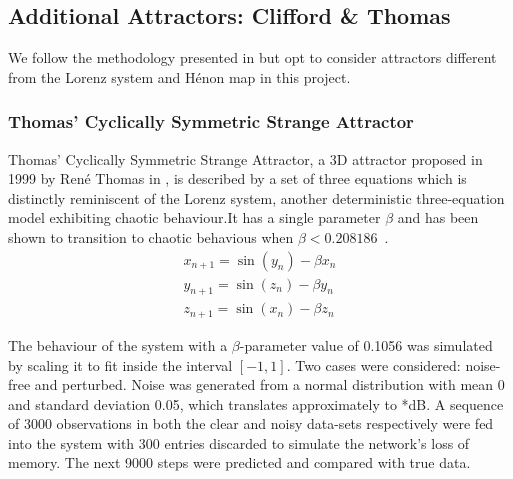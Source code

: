 \documentclass[a4paper,12pt,twoside]{report}
\begin{document}
\subsection{Additional Attractors: Clifford \& Thomas}
We follow the methodology presented in \cite{manjunath2021universal} but opt to consider attractors different from the Lorenz system and H\'enon map in this project.

\subsubsection{Thomas' Cyclically Symmetric Strange Attractor}
Thomas' Cyclically Symmetric Strange Attractor, a 3D attractor proposed in 1999 by Ren\'e Thomas in \cite{ThomasAttractor}, is described by a set of three equations which is distinctly reminiscent of the Lorenz system, another deterministic three-equation model exhibiting chaotic behaviour.It has a single parameter $\beta$ and has been shown to transition to chaotic behavious when $\beta<0.208186$~\cite{Thomas_BetaParameter}.
\begin{eqnarray}\label{eqns_thomas}
  x_{n+1} = \sin(y_n) - \beta{x_n} \\
  y_{n+1} = \sin(z_n) - \beta{y_n} \\
  z_{n+1} = \sin(x_n) - \beta{z_n}
\end{eqnarray}

The behaviour of the system with a $\beta$-parameter value of 0.1056 was simulated by scaling it to fit inside the interval $[-1,1]$. Two cases were considered: noise-free and perturbed. Noise was generated from a normal distribution with mean 0 and standard deviation 0.05, which translates approximately to *dB.
 A sequence of 3000 observations in both the clear and noisy data-sets respectively were fed into the system with 300 entries discarded to simulate the network's loss of memory. The next 9000 steps were predicted and compared with true data.
\end{document}
